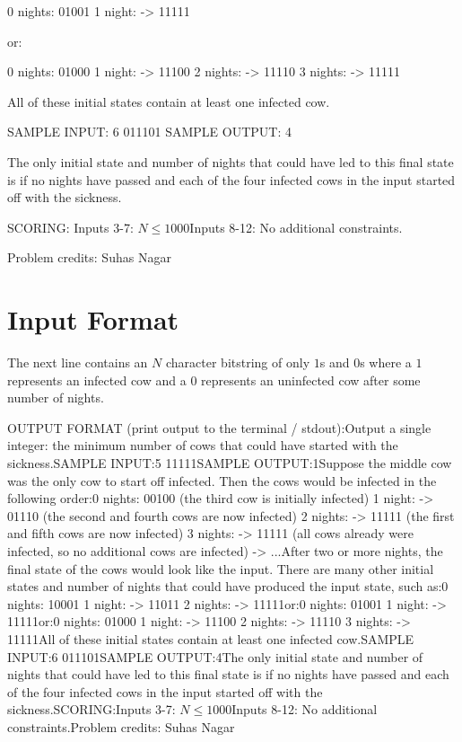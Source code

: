 \documentclass[12pt]{article}
\begin{document}
0 nights:    01001
1 night:  -> 11111

or:


0 nights:    01000
1 night:  -> 11100
2 nights: -> 11110
3 nights: -> 11111

All of these initial states contain at least one infected cow.

SAMPLE INPUT:
6
011101
SAMPLE OUTPUT: 
4

The only initial state and number of nights that could have led to this final
state is if no nights have passed and each of the four infected cows in the
input started off with the sickness.

SCORING:
Inputs 3-7: $N \le 1000$Inputs 8-12: No additional constraints.


Problem credits: Suhas Nagar



\section*{Input Format}
The next line contains an $N$ character bitstring of only $1$s and $0$s where a
$1$ represents an infected cow and a $0$ represents an uninfected cow after some
number of nights.

OUTPUT FORMAT (print output to the terminal / stdout):Output a single integer: the minimum number of cows that could have started 
with the sickness.SAMPLE INPUT:5
11111SAMPLE OUTPUT:1Suppose the middle cow was the only cow to start off infected. Then the cows 
would be infected in the following order:0 nights:    00100 (the third cow is initially infected)
1 night:  -> 01110 (the second and fourth cows are now infected)
2 nights: -> 11111 (the first and fifth cows are now infected)
3 nights: -> 11111 (all cows already were infected, so no additional cows are infected)
          -> ...After two or more nights, the final state of the cows would look like the input.
There are many other initial states and number of nights that could have
produced the input state, such as:0 nights:    10001
1 night:  -> 11011
2 nights: -> 11111or:0 nights:    01001
1 night:  -> 11111or:0 nights:    01000
1 night:  -> 11100
2 nights: -> 11110
3 nights: -> 11111All of these initial states contain at least one infected cow.SAMPLE INPUT:6
011101SAMPLE OUTPUT:4The only initial state and number of nights that could have led to this final
state is if no nights have passed and each of the four infected cows in the
input started off with the sickness.SCORING:Inputs 3-7: $N \le 1000$Inputs 8-12: No additional constraints.Problem credits: Suhas Nagar
\end{document}
